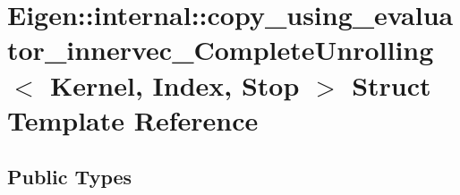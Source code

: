 \hypertarget{struct_eigen_1_1internal_1_1copy__using__evaluator__innervec___complete_unrolling}{}\section{Eigen\+:\+:internal\+:\+:copy\+\_\+using\+\_\+evaluator\+\_\+innervec\+\_\+\+Complete\+Unrolling$<$ Kernel, Index, Stop $>$ Struct Template Reference}
\label{struct_eigen_1_1internal_1_1copy__using__evaluator__innervec___complete_unrolling}
\subsection*{Public Types}
